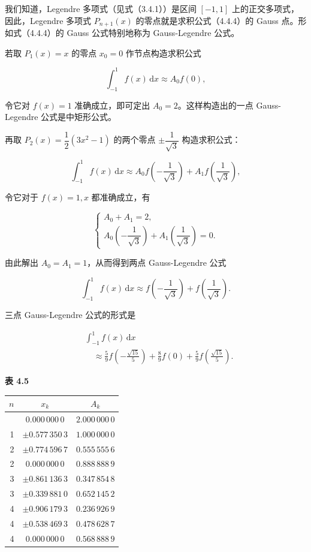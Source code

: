 \documentclass[
  10pt,
  fontset=fandol]{ctexart}
\newcounter{none} %
\begin{document}
我们知道，Legendre 多项式（见式（3.4.1））是区间 \([-1,1]\) 上的正交多项式，因此，Legendre 多项式 \(P_{n+1}(x)\) 的零点就是求积公式（4.4.4）的 Gauss 点。形如式（4.4.4）的 Gauss 公式特别地称为 Gauss-Legendre 公式。

若取 \(P_1(x)=x\) 的零点 \(x_0=0\) 作节点构造求积公式

\[
\int_{-1}^{1}f(x)\,\mathrm{d}x\approx A_0f(0),
\]

令它对 \(f(x)=1\) 准确成立，即可定出 \(A_0=2\)。这样构造出的一点 Gauss-Legendre 公式是中矩形公式。

再取 \(P_2(x)=\dfrac12(3x^2-1)\) 的两个零点 \(\pm\dfrac1{\sqrt3}\) 构造求积公式：

\[
\int_{-1}^{1}f(x)\,\mathrm{d}x\approx
A_0f\left(-\frac1{\sqrt3}\right)+A_1f\left(\frac1{\sqrt3}\right),
\]

令它对于 \(f(x)=1,x\) 都准确成立，有

\[
\begin{cases}
A_0+A_1=2,\\[3pt]
A_0\left(-\dfrac1{\sqrt3}\right)+A_1\left(\dfrac1{\sqrt3}\right)=0.
\end{cases}
\]

由此解出 \(A_0=A_1=1\)，从而得到两点 Gauss-Legendre 公式

\[
\int_{-1}^{1}f(x)\,\mathrm{d}x\approx
f\left(-\frac1{\sqrt3}\right)+f\left(\frac1{\sqrt3}\right).
\]

三点 Gauss-Legendre 公式的形式是

\[
\begin{aligned}
&\int_{-1}^{1}f(x)\,\mathrm{d}x\\
&\quad\approx\frac59f\left(-\frac{\sqrt{15}}5\right)
+\frac89f(0)+\frac59f\left(\frac{\sqrt{15}}5\right).
\end{aligned}
\]

\textbf{表 4.5}

{\def\LTcaptype{none} %
\begin{longtable}[]{@{}rcc@{}}
\toprule\noalign{}
\(n\) & \(x_k\) & \(A_k\) \\
\midrule\noalign{}
\endhead
\bottomrule\noalign{}
\endlastfoot
0 & \(0.000\,000\,0\) & \(2.000\,000\,0\) \\
1 & \(\pm0.577\,350\,3\) & \(1.000\,000\,0\) \\
2 & \(\pm0.774\,596\,7\) & \(0.555\,555\,6\) \\
2 & \(0.000\,000\,0\) & \(0.888\,888\,9\) \\
3 & \(\pm0.861\,136\,3\) & \(0.347\,854\,8\) \\
3 & \(\pm0.339\,881\,0\) & \(0.652\,145\,2\) \\
4 & \(\pm0.906\,179\,3\) & \(0.236\,926\,9\) \\
4 & \(\pm0.538\,469\,3\) & \(0.478\,628\,7\) \\
4 & \(0.000\,000\,0\) & \(0.568\,888\,9\) \\
\end{longtable}
}
\end{document}
